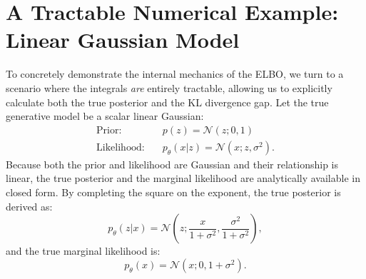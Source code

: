 \section{A Tractable Numerical Example: Linear Gaussian Model}

To concretely demonstrate the internal mechanics of the ELBO, we turn to a scenario where the integrals \textit{are} entirely tractable, allowing us to explicitly calculate both the true posterior and the KL divergence gap. Let the true generative model be a scalar linear Gaussian:
\begin{align}
    \text{Prior:} \quad & p(z) = \mathcal{N}(z; 0, 1) \\
    \text{Likelihood:} \quad & p_\theta(x|z) = \mathcal{N}(x; z, \sigma^2).
\end{align}
Because both the prior and likelihood are Gaussian and their relationship is linear, the true posterior and the marginal likelihood are analytically available in closed form. By completing the square on the exponent, the true posterior is derived as:
\begin{equation}
    p_\theta(z|x) = \mathcal{N}\left(z; \frac{x}{1+\sigma^2}, \frac{\sigma^2}{1+\sigma^2}\right),
\end{equation}
and the true marginal likelihood is:
\begin{equation}
    p_\theta(x) = \mathcal{N}(x; 0, 1+\sigma^2).
\end{equation}

